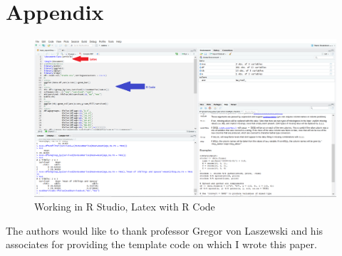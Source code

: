 \documentclass[sigconf]{acmart}
\begin{document}
\section{Appendix} 
 \begin{figure}[htb]
  \centering
  \includegraphics[width=1.0\columnwidth]{paper2/Latex With R Code in R Studio.png}
  \caption{Working in R Studio, Latex with R Code
  \cite{Tibenkana and Driscoll}}
  \label{fig:Latex With R Code in R Studio} 
\end{figure}
 
\begin{acks}

The authors would like to thank professor Gregor von Laszewski and his associates for providing the template code on which I wrote this paper.

\end{acks}


 


\end{document}
